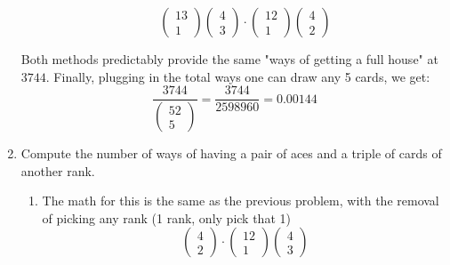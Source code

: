 \documentclass{article}
\begin{document}
\begin{enumerate}[label=\alph*)]
\begin{enumerate}[label=\arabic*.]
\begin{equation*}
            \begin{pmatrix}
                13 \\
                1
            \end{pmatrix}
            \begin{pmatrix}
                4 \\
                3
            \end{pmatrix}
            \cdot
            \begin{pmatrix}
                12 \\
                1
            \end{pmatrix}
            \begin{pmatrix}
                4 \\
                2
            \end{pmatrix}
        \end{equation*}
    \end{enumerate}
    Both methods predictably provide the same "ways of getting a full house" at \(3744\).
    Finally, plugging in the total ways one can draw any 5 cards, we get:
    \begin{equation*}
        \frac{3744}{
            \begin{pmatrix}
                52 \\
                5
            \end{pmatrix}
        } = \frac{3744}{2598960} = 0.00144
    \end{equation*}
    \item Compute the number of ways of having a pair of aces and a triple of cards of another rank.
    \begin{enumerate}[label=\arabic*.]
        \item The math for this is the same as the previous problem, with the removal of picking any rank (1 rank, only pick that 1)
        \begin{equation*}
            \begin{pmatrix}
                4 \\
                2
            \end{pmatrix}
            \cdot
            \begin{pmatrix}
                12 \\
                1
            \end{pmatrix}
            \begin{pmatrix}
                4 \\
                3

\end{pmatrix}
\end{equation*}
\end{enumerate}
\end{enumerate}
\end{document}
